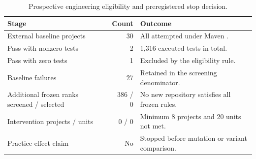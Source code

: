 \documentclass[pdflatex,sn-basic]{sn-jnl}
\newcommand{\codeid}[1]{\texttt{\detokenize{#1}}}
\begin{document}
\begin{table}[htbp]
\caption{Prospective engineering eligibility and preregistered stop decision.}
\label{tab:external-engineering-gate}
{\footnotesize
\setlength{\tabcolsep}{4pt}
\begin{tabularx}{\linewidth}{@{}l r Y@{}}
\toprule
Stage & Count & Outcome \\
\midrule
External baseline projects & 30 & All attempted under Maven \codeid{test}. \\
Pass with nonzero tests & 2 & 1,316 executed tests in total. \\
Pass with zero tests & 1 & Excluded by the eligibility rule. \\
Baseline failures & 27 & Retained in the screening denominator. \\
Additional frozen ranks screened / selected & 386 / 0 & No new repository satisfies all frozen rules. \\
Intervention projects / units & 0 / 0 & Minimum 8 projects and 20 units not met. \\
Practice-effect claim & No & Stopped before mutation or variant comparison. \\
\bottomrule
\end{tabularx}
}
\end{table}
\end{document}
